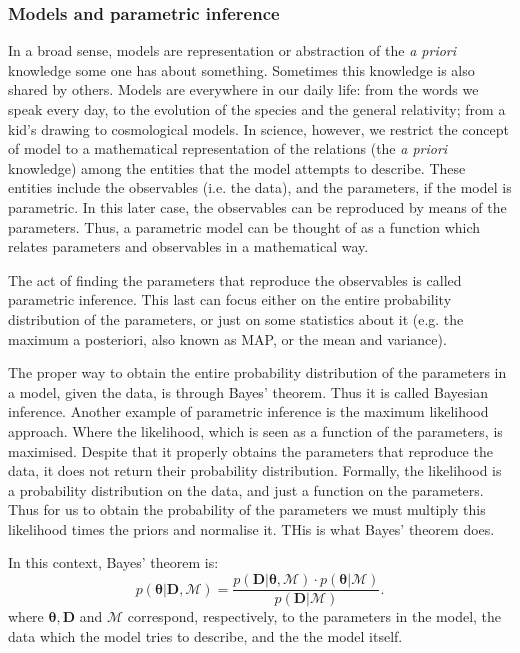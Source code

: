 \subsubsection{Models and parametric inference}
In a broad sense, models are representation or abstraction of the \emph{a priori} knowledge some one has about something. Sometimes this knowledge is also shared by others. Models are everywhere in our daily life: from the words we speak every day, to the evolution of the species and the general relativity; from a kid's drawing to cosmological models. In science, however, we restrict the concept of model to a mathematical representation of the relations (the \emph{a priori} knowledge) among the entities that the model attempts to describe. These entities include the observables (i.e. the data), and the parameters, if the model is parametric. In this later case, the observables can be reproduced by means of the parameters. Thus, a parametric model can be thought of as a function which relates parameters and observables in a mathematical way. 

The act of finding the parameters that reproduce the observables is called parametric inference. This last can focus either on the entire probability distribution of the parameters, or just on some statistics about it (e.g. the maximum a posteriori, also known as MAP, or the mean and variance).

The proper way to obtain the entire probability distribution of the parameters in a model, given the data, is through Bayes' theorem. Thus it is called Bayesian inference. Another example of parametric inference is the maximum likelihood approach. Where the likelihood, which is seen as a function of the parameters, is maximised. Despite that it properly obtains the parameters that reproduce the data, it does not return their probability distribution. Formally, the likelihood is a probability distribution on the data, and just a function on the parameters. Thus for us to obtain the probability of the parameters we must multiply this likelihood times the priors and normalise it. THis is what Bayes' theorem does.

In this context, Bayes' theorem is:
\begin{equation}
p(\mathbf{\theta}|\mathbf{D},\mathcal{M}) = \frac{p(\mathbf{D}|\mathbf{\theta},\mathcal{M})\cdot p(\mathbf{\theta}|\mathcal{M})}{p(\mathbf{D}|\mathcal{M})}.
\end{equation}
where $\mathbf{\theta},\mathbf{D}$ and $\mathcal{M}$ correspond, respectively, to the parameters in the model, the data which the model tries 
to describe, and the the model itself. 

